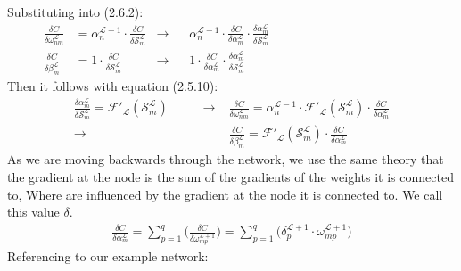 \documentclass{report}
\begin{document}
Substituting into (2.6.2):
\begin{align}
    \frac{\delta C}{\delta \omega^{\mathcal{L}}_{nm}} &=  \alpha_{n}^{\mathcal{L}-1} \cdot\frac{\delta C}{\delta \mathcal{S}^{\mathcal{L}}_m}  &\rightarrow& \hspace{10pt}\alpha_{n}^{\mathcal{L}-1} \cdot\frac{\delta C}{\delta \alpha^{\mathcal{L}}_m}\cdot\frac{\delta \alpha^{\mathcal{L}}_m}{\delta \mathcal{S}^{\mathcal{L}}_m} \\
    \frac{\delta C}{\delta \beta^{\mathcal{L}}_{m}} &= 1 \cdot\frac{\delta C}{\delta \mathcal{S}^{\mathcal{L}}_m} &\rightarrow& \hspace{10pt}1 \cdot\frac{\delta C}{\delta \alpha^{\mathcal{L}}_m}\cdot\frac{\delta \alpha^{\mathcal{L}}_m}{\delta \mathcal{S}^{\mathcal{L}}_m}\qquad \qquad \qquad \qquad \qquad \qquad \qquad
\end{align}
Then it follows with equation (2.5.10):
\begin{align}
    \frac{\delta \alpha^{\mathcal{L}}_m}{\delta \mathcal{S}^{\mathcal{L}}_m} = \mathcal{F}'_{\mathcal{L}}(\mathcal{S}^{\mathcal{L}}_m)\hspace{30pt}\rightarrow&  \frac{\delta C}{\delta \omega^{\mathcal{L}}_{nm}} = \alpha_{n}^{\mathcal{L}-1} \cdot \mathcal{F}'_{\mathcal{L}}(\mathcal{S}^{\mathcal{L}}_m) \cdot \frac{\delta C}{\delta \alpha^{\mathcal{L}}_m}\\
    \rightarrow& \frac{\delta C}{\delta \beta^{\mathcal{L}}_{m}} = \mathcal{F}'_{\mathcal{L}}(\mathcal{S}^{\mathcal{L}}_m) \cdot \frac{\delta C}{\delta \alpha^{\mathcal{L}}_m}
\end{align}
As we are moving backwards through the network, we use the same theory that the gradient at the node is the sum of the gradients of the weights it is connected to,
Where are influenced by the gradient at the node it is connected to. We call this value $\delta$.
\begin{align}
    \frac{\delta C}{\delta \alpha^{\mathcal{L}}_m} = \sum_{p=1}^{q}\Big(\frac{\delta C}{\delta \omega^{\mathcal{L}+1}_{mp}}\Big) = \sum_{p=1}^{q}\Big(\delta^{\mathcal{L}+1}_{p} \cdot \omega^{\mathcal{L}+1}_{mp}\Big)
\end{align}
Referencing to our example network:
\vspace{1em}
\newline
\end{document}
